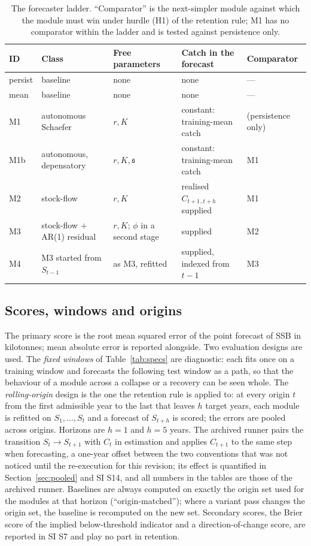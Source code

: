 \documentclass[preprint,11pt,authoryear]{elsarticle}
\theoremstyle{definition}
\theoremstyle{remark}
\newcommand{\sA}{\mathfrak{s}}
\begin{document}
\begin{table}[!htb]
\centering\small
\caption{The forecaster ladder. ``Comparator'' is the next-simpler module against which the module must win under hurdle (H1) of the retention rule; M1 has no comparator within the ladder and is tested against persistence only.}
\label{tab:ladder}
\begin{tabularx}{\textwidth}{@{}l>{\raggedright\arraybackslash}p{}>{\raggedright\arraybackslash}p{}LL@{}}
\toprule
ID & Class & Free parameters & Catch in the forecast & Comparator \\
\midrule
persist & baseline & none & none & --- \\
mean & baseline & none & none & --- \\
M1 & autonomous Schaefer & $r,K$ & constant: training-mean catch & (persistence only) \\
M1b & autonomous, depensatory & $r,K,\sA$ & constant: training-mean catch & M1 \\
M2 & stock-flow & $r,K$ & realised $C_{t+1..t+h}$ supplied & M1 \\
M3 & stock-flow $+$ AR(1) residual & $r,K$; $\phi$ in a second stage & supplied & M2 \\
M4 & M3 started from $S_{t-1}$ & as M3, refitted & supplied, indexed from $t-1$ & M3 \\
\bottomrule
\end{tabularx}
\end{table}

\subsection{Scores, windows and origins}\label{sec:scores}

The primary score is the root mean squared error of the point forecast of SSB in kilotonnes; mean absolute error is reported alongside. Two evaluation designs are used. The \emph{fixed windows} of Table~\ref{tab:specs} are diagnostic: each fits once on a training window and forecasts the following test window as a path, so that the behaviour of a module across a collapse or a recovery can be seen whole. The \emph{rolling-origin} design \citep{Tashman2000} is the one the retention rule is applied to: at every origin $t$ from the first admissible year to the last that leaves $h$ target years, each module is refitted on $S_1,\dots,S_t$ and a forecast of $S_{t+h}$ is scored; the errors are pooled across origins. Horizons are $h=1$ and $h=5$ years. The archived runner pairs the transition $S_t\to S_{t+1}$ with $C_t$ in estimation and applies $C_{t+1}$ to the same step when forecasting, a one-year offset between the two conventions that was not noticed until the re-execution for this revision; its effect is quantified in Section~\ref{sec:pooled} and SI S14, and all numbers in the tables are those of the archived runner. Baselines are always computed on exactly the origin set used for the modules at that horizon (``origin-matched''); where a variant pass changes the origin set, the baseline is recomputed on the new set. Secondary scores, the Brier score of the implied below-threshold indicator and a direction-of-change score, are reported in SI S7 and play no part in retention.
\end{document}
